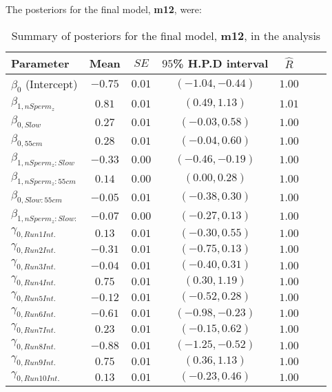 \documentclass{article}
\begin{document}
The posteriors for the final model, \textbf{m12}, were:

\begin{table}[!ht]
\caption{Summary of posteriors for the final model, \textbf{m12}, in the  analysis}
\label{Table:NxRateFinalModel}
\centering
\begin{tabular}{l c c c c c c} \hline
Parameter & Mean & $SE$ & $95$\% H.P.D interval & $\hat{R}$\\
\hline
$\beta_{0}$ (Intercept)      & $-0.75$ & $0.01$ & $(-1.04,-0.44)$ & $1.00$ \\
$\beta_{1,nSperm_z}$         & $ 0.81$ & $0.01$ & $( 0.49, 1.13)$ & $1.01$ \\
$\beta_{0,Slow}$             & $ 0.27$ & $0.01$ & $(-0.03, 0.58)$ & $1.00$ \\
$\beta_{0,55cm}$             & $ 0.28$ & $0.01$ & $(-0.04, 0.60)$ & $1.00$ \\
$\beta_{1,nSperm_z:Slow}$    & $-0.33$ & $0.00$ & $(-0.46,-0.19)$ & $1.00$ \\
$\beta_{1,nSperm_z:55cm}$    & $ 0.14$ & $0.00$ & $( 0.00, 0.28)$ & $1.00$ \\
$\beta_{0,Slow:55cm}$        & $-0.05$ & $0.01$ & $(-0.38, 0.30)$ & $1.00$ \\
$\beta_{1,nSperm_z:Slow:}$   & $-0.07$ & $0.00$ & $(-0.27, 0.13)$ & $1.00$ \\
$\gamma_{0,Run1 Int.}$       & $ 0.13$ & $0.01$ & $(-0.30, 0.55)$ & $1.00$ \\
$\gamma_{0,Run2 Int.}$       & $-0.31$ & $0.01$ & $(-0.75, 0.13)$ & $1.00$ \\
$\gamma_{0,Run3 Int.}$       & $-0.04$ & $0.01$ & $(-0.40, 0.31)$ & $1.00$ \\
$\gamma_{0,Run4 Int.}$       & $ 0.75$ & $0.01$ & $( 0.30, 1.19)$ & $1.00$ \\
$\gamma_{0,Run5 Int.}$       & $-0.12$ & $0.01$ & $(-0.52, 0.28)$ & $1.00$ \\
$\gamma_{0,Run6 Int.}$       & $-0.61$ & $0.01$ & $(-0.98,-0.23)$ & $1.00$ \\
$\gamma_{0,Run7 Int.}$       & $ 0.23$ & $0.01$ & $(-0.15, 0.62)$ & $1.00$ \\
$\gamma_{0,Run8 Int.}$       & $-0.88$ & $0.01$ & $(-1.25,-0.52)$ & $1.00$ \\
$\gamma_{0,Run9 Int.}$       & $ 0.75$ & $0.01$ & $( 0.36, 1.13)$ & $1.00$ \\
$\gamma_{0,Run10 Int.}$      & $ 0.13$ & $0.01$ & $(-0.23, 0.46)$ & $1.00$ \\

\end{tabular}
\end{table}
\end{document}
